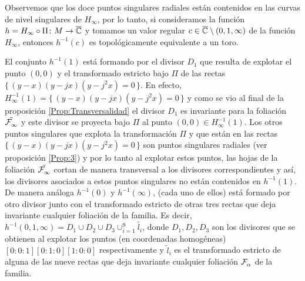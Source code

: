 Observemos que los doce puntos singulares radiales están contenidos en las curvas de nivel singulares de $H_{\infty}$, por lo tanto, si consideramos la función $h=H_{\infty}\circ\Pi\colon M\rightarrow\overline{\mathbb{C}}$ y tomamos un valor regular $c\in\overline{\mathbb{C}}\setminus(0,1,\infty)$ de la función $H_{\infty}$, entonces $h^{-1}(c)$ es topológicamente equivalente a un toro.

\begin{Obs}
\label{Obs:FibrasSingulares}
El conjunto $h^{-1}(1)$ está formando por el divisor $D_{1}$ que resulta de explotar el punto $(0,0)$ y el transformado estricto bajo $\Pi$ de las rectas $\{\, (y-x)(y-jx)(y-j^{2}x)=0\, \}$. En efecto, $H_{\infty}^{-1}(1)=\{\, (y-x)(y-jx)(y-j^{2}x)=0\, \}$ y como se vio al final de la proposición \ref{Prop:Transversalidad} el divisor $D_{1}$ es invariante para la foliación $\tilde{\mathcal{F}^{\ }_{\infty}}$ y este divisor se proyecta bajo $\Pi$ al punto $(0,0)\in H_{\infty}^{-1}(1)$. Los otros puntos singulares que explota la transformación $\Pi$ y que están en las rectas $\{\, (y-x)(y-jx)(y-j^{2}x)=0\, \}$ son puntos singulares radiales (ver proposición \ref{Prop:3}) y por lo tanto al explotar estos puntos, las hojas de la foliación $\tilde{\mathcal{F}^{\ }_{\infty}}$ cortan de manera transversal a los divisores correspondientes y así, los divisores asociados a estos puntos singulares no están contenidos en $h^{-1}(1)$. De manera análoga $h^{-1}(0)$ y $h^{-1}(\infty)$, (cada uno de ellos) está formado por otro divisor junto con el transformado estricto de otras tres rectas que deja invariante cualquier foliación de la familia. Es decir, $h^{-1}(0,1,\infty)=D_{1}\cup D_{2}\cup D_{3}\cup_{i=1}^{9}\tilde{l_{i}}$, donde $D_{1},D_{2},D_{3}$ son los divisores que se obtienen al explotar los puntos (en coordenadas homogéneas) $[0:0:1][0:1:0][1:0:0]$ respectivamente y $\tilde{l}_{i}$ es el transformado estricto de alguna de las nueve rectas que deja invariante cualquier foliación $\mathcal{F}^{\ }_{\alpha}$ de la familia.
\end{Obs}

